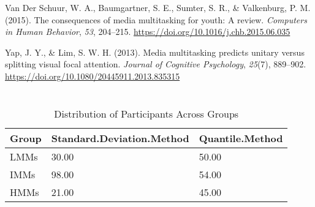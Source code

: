 \documentclass[
  man]{apa7}
\newlength{\cslhangindent}
\newenvironment{CSLReferences}[2] %
 {\begin{list}{}{%
  \setlength{\itemindent}{0pt}
  \setlength{\leftmargin}{0pt}
  \setlength{\parsep}{0pt}
  \ifodd #1
   \setlength{\leftmargin}{\cslhangindent}
   \setlength{\itemindent}{-1\cslhangindent}
  \fi
  \setlength{\itemsep}{#2\baselineskip}}}
 {\end{list}}
\begin{document}
\begin{CSLReferences}{1}{0}
Van Der Schuur, W. A., Baumgartner, S. E., Sumter, S. R., \& Valkenburg, P. M. (2015). The consequences of media multitasking for youth: {A} review. \emph{Computers in Human Behavior}, \emph{53}, 204--215. \url{https://doi.org/10.1016/j.chb.2015.06.035}

Yap, J. Y., \& Lim, S. W. H. (2013). Media multitasking predicts unitary versus splitting visual focal attention. \emph{Journal of Cognitive Psychology}, \emph{25}(7), 889--902. \url{https://doi.org/10.1080/20445911.2013.835315}

\end{CSLReferences}

\newpage

\appendix


\section{}\label{section}

\begin{table}[tbp]

\begin{center}
\begin{threeparttable}

\caption{\label{tab:unnamed-chunk-7}Distribution of Participants Across Groups}

\begin{tabular}{lll}
\toprule
Group & \multicolumn{1}{c}{Standard.Deviation.Method} & \multicolumn{1}{c}{Quantile.Method}\\
\midrule
LMMs & 30.00 & 50.00\\
IMMs & 98.00 & 54.00\\
HMMs & 21.00 & 45.00\\
\bottomrule
\end{tabular}

\end{threeparttable}
\end{center}

\end{table}
\end{document}
